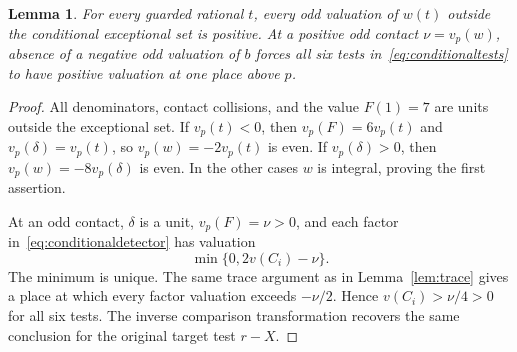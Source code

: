 \documentclass[11pt,a4paper]{article}
\newtheorem{lemma}[theorem]{Lemma}
\begin{document}
\begin{lemma}\label{lem:conditionalodd}
For every guarded rational $t$, every odd valuation of $w(t)$
outside the conditional exceptional set is positive. At a positive
odd contact $\nu=v_p(w)$, absence of a negative odd valuation of $b$
forces all six tests in~\eqref{eq:conditionaltests} to have positive
valuation at one place above $p$.
\end{lemma}
\begin{proof}
All denominators, contact collisions, and the value $F(1)=7$ are units
outside the exceptional set. If $v_p(t)<0$, then
$v_p(F)=6v_p(t)$ and $v_p(\delta)=v_p(t)$, so
$v_p(w)=-2v_p(t)$ is even. If $v_p(\delta)>0$, then
$v_p(w)=-8v_p(\delta)$ is even. In the other cases $w$ is
integral, proving the first assertion.

At an odd contact, $\delta$ is a unit, $v_p(F)=\nu>0$, and each
factor in~\eqref{eq:conditionaldetector} has valuation
\[
                         \min\{0,2v(C_i)-\nu\}.
\]
The minimum is unique. The same trace argument as in
Lemma~\ref{lem:trace} gives a place at which every factor valuation
exceeds $-\nu/2$. Hence $v(C_i)>\nu/4>0$ for all six tests.
The inverse comparison transformation recovers the same conclusion
for the original target test $r-X$.
\end{proof}
\end{document}
